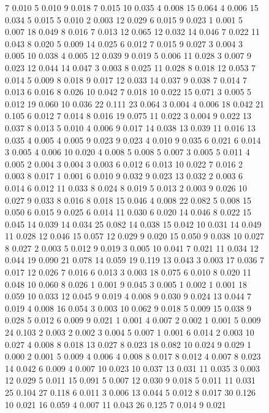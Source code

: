 \begin{figure}[htbp]
7 0.010  5 0.010  9 0.018  7 0.015  10 0.035  
4 0.008  15 0.064  4 0.006  15 0.034  5 0.015  
5 0.010  2 0.003  12 0.029  6 0.015  9 0.023  
1 0.001  5 0.007  18 0.049  8 0.016  7 0.013  
12 0.065  12 0.032  14 0.046  7 0.022  11 0.043  
8 0.020  5 0.009  14 0.025  6 0.012  7 0.015  
9 0.027  3 0.004  3 0.005  10 0.038  4 0.005  
12 0.039  9 0.019  5 0.006  11 0.028  3 0.007  
9 0.023  12 0.044  14 0.047  3 0.003  8 0.025  
11 0.028  8 0.018  12 0.053  7 0.014  5 0.009  
8 0.018  9 0.017  12 0.033  14 0.037  9 0.038  
7 0.014  7 0.013  6 0.016  8 0.026  10 0.042  
7 0.018  10 0.022  15 0.071  3 0.005  5 0.012  
19 0.060  10 0.036  22 0.111  23 0.064  3 0.004  
4 0.006  18 0.042  21 0.105  6 0.012  7 0.014  
8 0.016  19 0.075  11 0.022  3 0.004  9 0.022  
13 0.037  8 0.013  5 0.010  4 0.006  9 0.017  
14 0.038  13 0.039  11 0.016  13 0.035  4 0.005  
4 0.005  9 0.023  9 0.023  4 0.010  9 0.035  
6 0.021  6 0.014  3 0.005  4 0.006  10 0.020  
4 0.008  5 0.008  5 0.007  3 0.005  5 0.011  
4 0.005  2 0.004  3 0.004  3 0.003  6 0.012  
6 0.013  10 0.022  7 0.016  2 0.003  8 0.017  
1 0.001  6 0.010  9 0.032  9 0.023  13 0.032  
2 0.003  6 0.014  6 0.012  11 0.033  8 0.024  
8 0.019  5 0.013  2 0.003  9 0.026  10 0.027  
9 0.033  8 0.016  8 0.018  15 0.046  4 0.008  
22 0.082  5 0.008  15 0.050  6 0.015  9 0.025  
6 0.014  11 0.030  6 0.020  14 0.046  8 0.022  
15 0.045  14 0.039  14 0.034  25 0.082  14 0.038  
15 0.042  10 0.031  14 0.049  11 0.028  12 0.046  
15 0.057  12 0.029  9 0.020  15 0.050  9 0.038  
10 0.027  8 0.027  2 0.003  5 0.012  9 0.019  
3 0.005  10 0.041  7 0.021  11 0.034  12 0.044  
19 0.090  21 0.078  14 0.059  19 0.119  13 0.043  
3 0.003  17 0.036  7 0.017  12 0.026  7 0.016  
6 0.013  3 0.003  18 0.075  6 0.010  8 0.020  
11 0.048  10 0.060  8 0.026  1 0.001  9 0.045  
3 0.005  1 0.002  1 0.001  18 0.059  10 0.033  
12 0.045  9 0.019  4 0.008  9 0.030  
9 0.024  13 0.044  7 0.019  4 0.008  16 0.054  
3 0.003  10 0.062  9 0.018  5 0.009  15 0.038  
9 0.028  5 0.012  6 0.009  9 0.021  1 0.001  
4 0.007  2 0.002  1 0.001  5 0.009  24 0.103  
2 0.003  2 0.002  3 0.004  5 0.007  1 0.001  
6 0.014  2 0.003  10 0.027  4 0.008  8 0.018  
13 0.027  8 0.023  18 0.082  10 0.024  9 0.029  
1 0.000  2 0.001  5 0.009  4 0.006  4 0.008  
8 0.017  8 0.012  4 0.007  8 0.023  14 0.042  
6 0.009  4 0.007  10 0.023  10 0.037  13 0.031  
11 0.035  3 0.003  12 0.029  5 0.011  15 0.091  
5 0.007  12 0.030  9 0.018  5 0.011  11 0.031  
25 0.104  27 0.118  6 0.011  3 0.006  13 0.044  
5 0.012  8 0.017  30 0.126  10 0.021  16 0.059  
4 0.007  11 0.043  26 0.125  7 0.014  9 0.021  

\end{figure}
